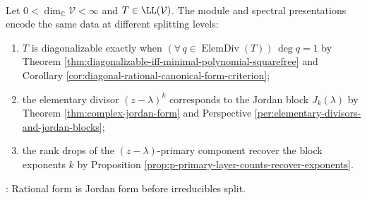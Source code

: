 \begin{perspective} \label{per:module-and-spectral-canonical-form-crosswalk} \\
Let $0<\dim_{\mathbb{C}}\mathcal{V}<\infty$ and $T\in\LL(\mathcal{V})$. The module and spectral presentations encode the same data at different splitting levels:
\begin{enumerate}[label=(\roman*)]
\setlength{\itemsep}{0pt}
\item $T$ is diagonalizable exactly when $(\forall\,q\in\operatorname{ElemDiv}(T))\,\deg q=1$ by Theorem \ref{thm:diagonalizable-iff-minimal-polynomial-squarefree} and Corollary \ref{cor:diagonal-rational-canonical-form-criterion};
\item the elementary divisor $(z-\lambda)^k$ corresponds to the Jordan block $J_k(\lambda)$ by Theorem \ref{thm:complex-jordan-form} and Perspective \ref{per:elementary-divisors-and-jordan-blocks};
\item the rank drops of the $(z-\lambda)$-primary component recover the block exponents $k$ by Proposition \ref{prop:p-primary-layer-counts-recover-exponents}.
\end{enumerate}
: Rational form is Jordan form before irreducibles split.
\end{perspective}

